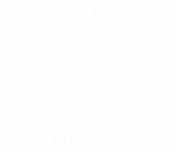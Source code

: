 \begin{titlepage}

\pagecolor{114F9D}\afterpage{\nopagecolor}

\begin{center}

\null

\vspace{50pt}

\textcolor{white}%
{
\Huge Übungen \& Hausaufgaben\\
\Huge \textbf{Analysis}\\
\vspace{8pt}
\Large WS2022/23-SS2023\\
}

\vspace{8pt}

\begin{figure}[h]%
\centering
{
\fboxsep=0pt
\fboxrule=3pt
}
\end{figure}

\vspace{4pt}

\textcolor{white}
{
\Huge Zehao Gao\\
\large M.Nummer 5052835\\
}

\begin{figure}[b]
\centering
\textcolor{white}
{
\Large \LaTeX
}
\end{figure}

\end{center}

\end{titlepage}
